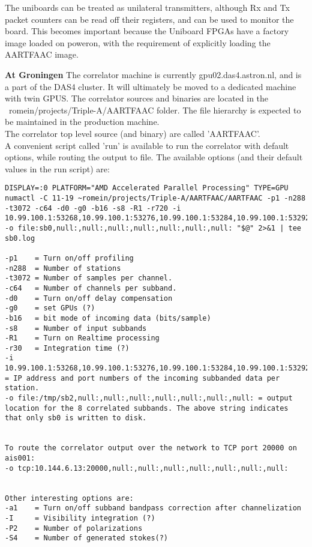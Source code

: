 \documentclass {article}
\begin{document}
The  uniboards can be treated as unilateral transmitters, although Rx and Tx packet counters can be read off their registers, and can be used to monitor the board. This becomes important because the Uniboard FPGAs have a factory image loaded on poweron, with the requirement of explicitly loading the AARTFAAC image.

\textbf {At Groningen} The correlator machine is currently gpu02.das4.astron.nl,
and is a part  of the DAS4 cluster.  It will ultimately  be moved to a dedicated
machine with twin  GPUS. The correlator sources and binaries  are located in the
~romein/projects/Triple-A/AARTFAAC folder.  The file hierarchy is expected to be
maintained in  the production  machine.\\ The correlator  top level  source (and
binary) are called  'AARTFAAC'.\\ A convenient script called  'run' is available
to  run  the  correlator with  default  options,  while  routing the  output  to
file. The  available options (and  their default values in the run script) are:
\begin{verbatim}
DISPLAY=:0 PLATFORM="AMD Accelerated Parallel Processing" TYPE=GPU numactl -C 11-19 ~romein/projects/Triple-A/AARTFAAC/AARTFAAC -p1 -n288 -t3072 -c64 -d0 -g0 -b16 -s8 -R1 -r720 -i 10.99.100.1:53268,10.99.100.1:53276,10.99.100.1:53284,10.99.100.1:53292,10.99.100.1:53300,10.99.100.1:53308 -o file:sb0,null:,null:,null:,null:,null:,null:,null: "$@" 2>&1 | tee sb0.log

-p1    = Turn on/off profiling
-n288  = Number of stations
-t3072 = Number of samples per channel.
-c64   = Number of channels per subband.
-d0    = Turn on/off delay compensation
-g0    = set GPUs (?)
-b16   = bit mode of incoming data (bits/sample)
-s8    = Number of input subbands
-R1    = Turn on Realtime processing
-r30   = Integration time (?)
-i
10.99.100.1:53268,10.99.100.1:53276,10.99.100.1:53284,10.99.100.1:53292,10.99.100.1:53300,10.99.100.1:53308
= IP address and port numbers of the incoming subbanded data per station.
-o file:/tmp/sb2,null:,null:,null:,null:,null:,null:,null: = output location for the 8 correlated subbands. The above string indicates that only sb0 is written to disk. 


To route the correlator output over the network to TCP port 20000 on ais001:
-o tcp:10.144.6.13:20000,null:,null:,null:,null:,null:,null:,null:


Other interesting options are:
-a1    = Turn on/off subband bandpass correction after channelization
-I     = Visibility integration (?)
-P2    = Number of polarizations
-S4    = Number of generated stokes(?)
\end{verbatim}
\end{document}

